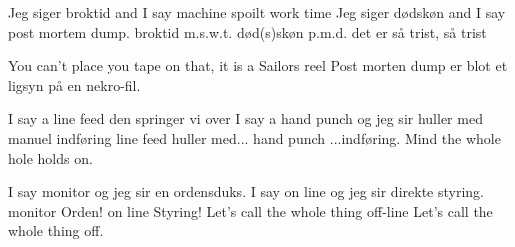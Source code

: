 \documentclass[a4paper,11pt]{article}
\begin{document}
\begin{song}
 Jeg siger broktid
 and I say machine spoilt work time
 Jeg siger dødskøn
 and I say post mortem dump.
 broktid
 m.s.w.t.
 død(s)skøn
 p.m.d.
 det er så trist, så trist 

 You can't place you tape on that, it is a Sailors reel
 Post morten dump er blot et ligsyn på en nekro-fil.

 I say a line feed
 den springer vi over
 I say a hand punch
 og jeg sir huller med manuel indføring
 line feed
  huller med...
 hand punch
 ...indføring.
 Mind the whole hole holds on.

 I say monitor
 og jeg sir en ordensduks.
 I say on line
 og jeg sir direkte styring.
 monitor
 Orden!
 on line
 Styring!
 Let's call the whole thing off-line
 Let's call the whole thing off.
\end{song}
\end{document}
